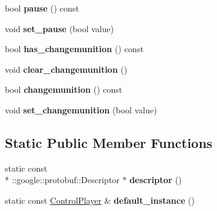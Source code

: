 \begin{DoxyCompactItemize}
\item 
\hypertarget{class_control_player_a549f93f53e0775162cc5d0d5d2cb1da8}{bool {\bfseries pause} () const }\label{class_control_player_a549f93f53e0775162cc5d0d5d2cb1da8}

\item 
\hypertarget{class_control_player_a1c8b853b906342b1c1b9ce15add0721d}{void {\bfseries set\-\_\-pause} (bool value)}\label{class_control_player_a1c8b853b906342b1c1b9ce15add0721d}

\item 
\hypertarget{class_control_player_a106aabf9080b2b4f0cb394c7eaa0cd2a}{bool {\bfseries has\-\_\-changemunition} () const }\label{class_control_player_a106aabf9080b2b4f0cb394c7eaa0cd2a}

\item 
\hypertarget{class_control_player_a4a1f53c88470a7ac2978a3575d5e92d5}{void {\bfseries clear\-\_\-changemunition} ()}\label{class_control_player_a4a1f53c88470a7ac2978a3575d5e92d5}

\item 
\hypertarget{class_control_player_a0010c94deab35537f06b77bb4a7ebc18}{bool {\bfseries changemunition} () const }\label{class_control_player_a0010c94deab35537f06b77bb4a7ebc18}

\item 
\hypertarget{class_control_player_ab22d1f02d208e63cd9a4bcfa20de3562}{void {\bfseries set\-\_\-changemunition} (bool value)}\label{class_control_player_ab22d1f02d208e63cd9a4bcfa20de3562}

\end{DoxyCompactItemize}
\subsection*{Static Public Member Functions}
\begin{DoxyCompactItemize}
\item 
\hypertarget{class_control_player_ac3b3c90e46a07ecabac236d5fd86ad2e}{static const \\*
\-::google\-::protobuf\-::\-Descriptor $\ast$ {\bfseries descriptor} ()}\label{class_control_player_ac3b3c90e46a07ecabac236d5fd86ad2e}

\item 
\hypertarget{class_control_player_ad03d0efd3008b639c64e3b2d09446f66}{static const \hyperlink{class_control_player}{Control\-Player} \& {\bfseries default\-\_\-instance} ()}\label{class_control_player_ad03d0efd3008b639c64e3b2d09446f66}

\end{DoxyCompactItemize}
